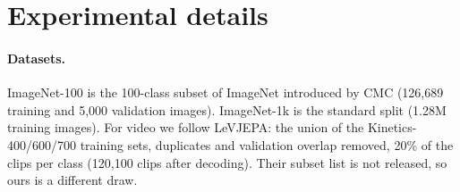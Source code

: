 \section{Experimental details}
\label{app:exp-details}

\paragraph{Datasets.}
ImageNet-100 is the 100-class subset of ImageNet introduced by CMC (126{,}689 training and 5{,}000 validation images). ImageNet-1k is the standard split (1.28M training images). For video we follow LeVJEPA: the union of the Kinetics-400/600/700 training sets, duplicates and validation overlap removed, 20\% of the clips per class (120{,}100 clips after decoding). Their subset list is not released, so ours is a different draw. %

